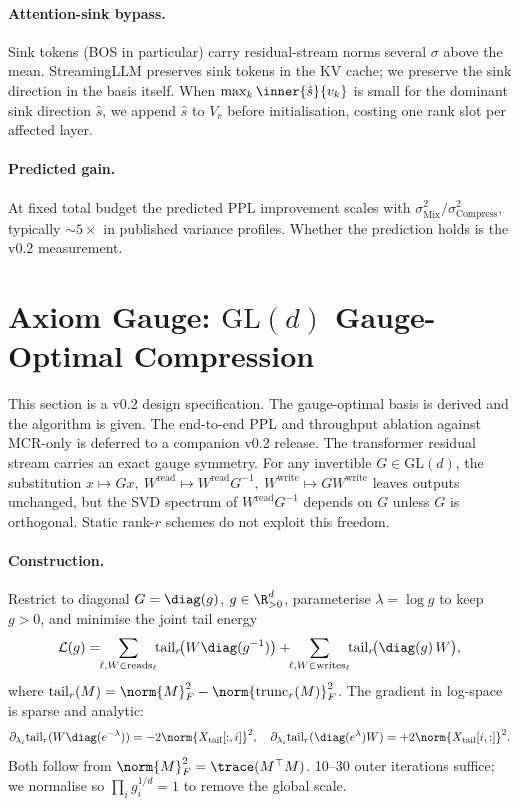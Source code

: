 \documentclass[11pt]{article}
\begin{document}
\paragraph{Attention-sink bypass.}  Sink tokens (BOS in particular) carry
residual-stream norms several $\sigma$ above the mean.  StreamingLLM
\cite{xiao2023streamingllm} preserves sink tokens in the KV cache; we
preserve the sink direction in the basis itself.  When
$\max_k\inner{\hat s}{v_k}$ is small for the dominant sink direction
$\hat s$, we append $\hat s$ to $V_r$ before initialisation, costing one
rank slot per affected layer.

\paragraph{Predicted gain.}  At fixed total budget the predicted PPL
improvement scales with $\sigma^2_\text{Mix}/\sigma^2_\text{Compress}$,
typically $\sim 5\times$ in published variance profiles.  Whether the
prediction holds is the v0.2 measurement.

\section{Axiom Gauge: $\mathrm{GL}(d)$ Gauge-Optimal Compression}
\label{sec:gauge}
This section is a v0.2 design specification. The gauge-optimal basis is derived and the algorithm is given. The end-to-end PPL and throughput ablation against MCR-only is deferred to a companion v0.2 release.
The transformer residual stream carries an exact gauge symmetry.  For any
invertible $G\in\mathrm{GL}(d)$, the substitution
$x\!\mapsto\!Gx,\ W^\text{read}\!\mapsto\!W^\text{read}G^{-1},\
W^\text{write}\!\mapsto\!GW^\text{write}$ leaves outputs unchanged, but
the SVD spectrum of $W^\text{read}G^{-1}$ depends on $G$ unless $G$ is
orthogonal.  Static rank-$r$ schemes do not exploit this freedom.

\paragraph{Construction.}  Restrict to diagonal $G=\diag(g)$, $g\in\R^d_{>0}$,
parameterise $\lambda=\log g$ to keep $g>0$, and minimise the joint tail
energy
\[
\mathcal{L}(g)=\!\!\sum_{\ell,W\in\text{reads}_\ell}\!\!\mathrm{tail}_r\!\bigl(W\diag(g^{-1})\bigr)
+\!\!\sum_{\ell,W\in\text{writes}_\ell}\!\!\mathrm{tail}_r\!\bigl(\diag(g)\,W\bigr),
\]
where $\mathrm{tail}_r(M)=\norm{M}_F^2-\norm{\mathrm{trunc}_r(M)}_F^2$.  The
gradient in log-space is sparse and analytic:
\[
\partial_{\lambda_i}\mathrm{tail}_r(W\diag(e^{-\lambda}))=-2\norm{X_\text{tail}[:,i]}^2,\quad
\partial_{\lambda_i}\mathrm{tail}_r(\diag(e^{\lambda})W)=+2\norm{X_\text{tail}[i,:]}^2.
\]
Both follow from $\norm{M}_F^2=\trace(M^\top M)$.  10--30 outer iterations
suffice; we normalise so $\prod_i g_i^{1/d}=1$ to remove the global scale.
\end{document}
